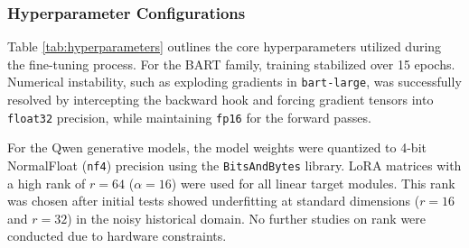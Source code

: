 \documentclass[11pt]{extarticle}
\begin{document}
\subsubsection{Hyperparameter Configurations}
Table \ref{tab:hyperparameters} outlines the core hyperparameters utilized during the fine-tuning process. For the BART family, training stabilized over 15 epochs. Numerical instability, such as exploding gradients in \texttt{bart-large}, was successfully resolved by intercepting the backward hook and forcing gradient tensors into \texttt{float32} precision, while maintaining \texttt{fp16} for the forward passes.

For the Qwen generative models, the model weights were quantized to 4-bit NormalFloat (\texttt{nf4}) precision using the \texttt{BitsAndBytes} library. LoRA matrices with a high rank of $r=64$ ($\alpha=16$) were used for all linear target modules. This rank was chosen after initial tests showed underfitting at standard dimensions ($r=16$ and $r=32$) in the noisy historical domain. No further studies on rank were conducted due to hardware constraints.
\end{document}
